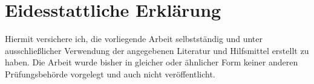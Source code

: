 \chapter*{Eidesstattliche Erklärung}

Hiermit versichere ich, die vorliegende Arbeit selbstständig und unter ausschließlicher Verwendung der angegebenen Literatur und Hilfsmittel erstellt zu haben. Die Arbeit wurde bisher in gleicher oder ähnlicher Form keiner anderen Prüfungsbehörde vorgelegt und auch nicht veröffentlicht.

